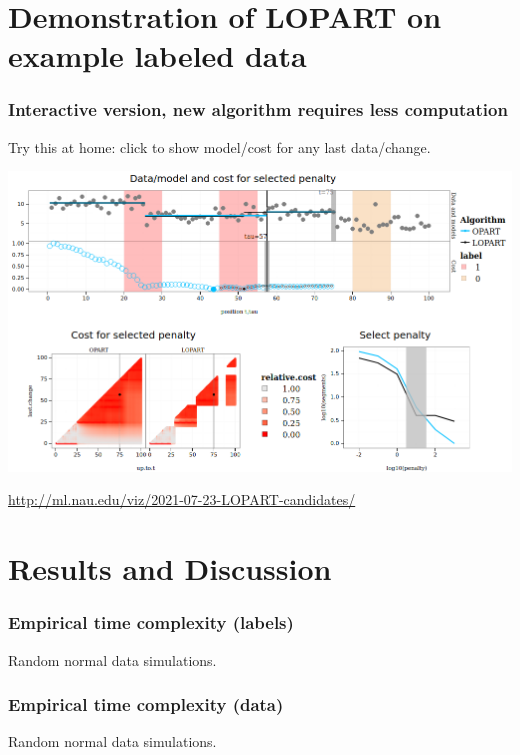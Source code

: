 \documentclass{beamer}
\begin{document}
\section{Demonstration of LOPART on example labeled data}


 
\begin{frame}
  \frametitle{Interactive version, new algorithm requires less computation}
  Try this at home: click to show model/cost for any last data/change.

  \includegraphics[width=\textwidth]{screenshot-LOPART-interactive}

  \url{http://ml.nau.edu/viz/2021-07-23-LOPART-candidates/}
\end{frame}

\section{Results and Discussion}

\begin{frame}
  \frametitle{Empirical time complexity (labels)}
  

  Random normal data simulations.
\end{frame}

\begin{frame}
  \frametitle{Empirical time complexity (data)}
  

  Random normal data simulations.
\end{frame}
\end{document}
